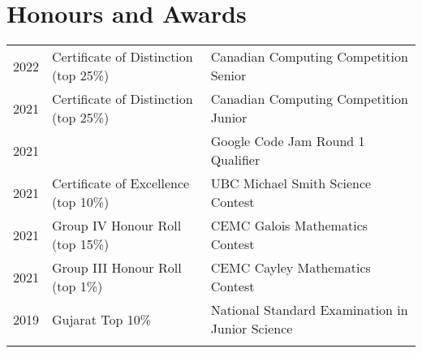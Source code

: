 
\section{Honours and Awards} 
\begin{tabular}{rll}
2022 & Certificate of Distinction (top 25\%) & Canadian Computing Competition Senior \\ 
2021 & Certificate of Distinction (top 25\%) & Canadian Computing Competition Junior \\ 
2021 & & Google Code Jam Round 1 Qualifier \\   
2021 & Certificate of Excellence (top 10\%) & UBC Michael Smith Science Contest \\ 
2021 & Group IV Honour Roll (top 15\%) & CEMC Galois Mathematics Contest \\ 
2021 & Group III Honour Roll (top 1\%) & CEMC Cayley Mathematics Contest \\
2019  & Gujarat Top 10\% & National Standard Examination in Junior Science \\  
\\
\end{tabular}
\sectionsep